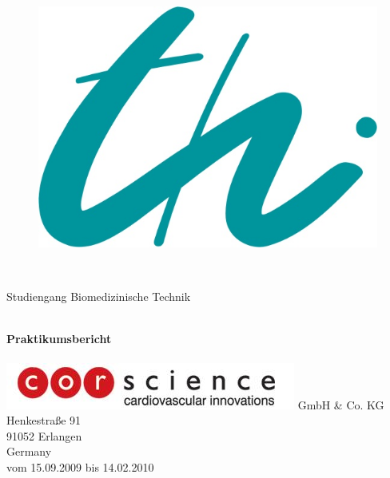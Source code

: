 \begin{titlepage}

\begin{center}

{\normalsize{}\fontsize{14}{14}\selectfont

\vspace{-2cm}

\begin{figure}[h!]
\includegraphics[width=0.2\hsize]{logo_gr.jpg}\hfill
\begin{minipage}[b]{0.75\hsize}
{\fontsize{25pt}{20} \selectfont{%
   Technische Universität Ilmenau}}\\[1ex]
{\fontsize{12pt}{10} \selectfont{%
  Fakultät für Informatik und Automatisierung\\
      Institut für Biomedizinische Technik und Informatik\\
    }}
\end{minipage}
\end{figure}

\vspace{20mm}
}

\large{Studiengang Biomedizinische Technik}

\HRule \\[0.4cm]
{ \huge \bfseries Praktikumsbericht}\\[0.4cm]

\HRule \\[1.5cm]

\includegraphics[width=0.2\hsize]{header_logo.jpg} GmbH \& Co. KG \\
Henkestraße 91 \\
91052 Erlangen \\
Germany \\
vom 15.09.2009 bis 14.02.2010

\vspace{20mm}


\end{center}
\end{titlepage}
